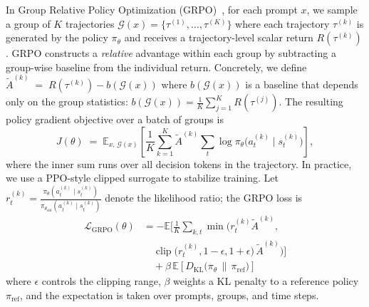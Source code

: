 In Group Relative Policy Optimization (GRPO)~\citep{shao2024deepseekmathpushinglimitsmathematical}, for each prompt $x$, we sample a group of $K$ trajectories $\mathcal{G}(x) = \{\tau^{(1)}, \dots, \tau^{(K)}\}$
where each trajectory $\tau^{(k)}$ is generated by the policy $\pi_\theta$ and receives a trajectory-level scalar return $R(\tau^{(k)})$.
GRPO constructs a \emph{relative} advantage within each group by subtracting a group-wise baseline from the individual return. Concretely, we define $\tilde{A}^{(k)} \;=\; R(\tau^{(k)}) - b(\mathcal{G}(x))$
where $b(\mathcal{G}(x))$ is a baseline that depends only on the group statistics: $b(\mathcal{G}(x)) = \frac{1}{K} \sum_{j=1}^K R(\tau^{(j)})$.
The resulting policy gradient objective over a batch of groups is
\begin{equation*}
    J(\theta) \;=\; 
    \mathbb{E}_{x,\,\mathcal{G}(x)}\!\left[
        \frac{1}{K} \sum_{k=1}^K 
        \tilde{A}^{(k)} \sum_{t} \log \pi_\theta\!\big(a_t^{(k)} \mid s_t^{(k)}\big)
    \right],
\end{equation*}
where the inner sum runs over all decision tokens in the trajectory. In practice, we use a PPO-style clipped surrogate to stabilize training. Let $r_t^{(k)} = \frac{\pi_\theta(a_t^{(k)} \mid s_t^{(k)})}{\pi_{\theta_{\text{old}}}(a_t^{(k)} \mid s_t^{(k)})}$ denote the likelihood ratio; the GRPO loss is
\begin{equation}
\begin{split}
    \mathcal{L}_{\text{GRPO}}(\theta) &= - \mathbb{E}\Bigg[ \frac{1}{K} \sum_{k,t} \min\bigg( r_t^{(k)} \tilde{A}^{(k)}, \\
    &\quad \operatorname{clip}\big(r_t^{(k)}, 1-\epsilon, 1+\epsilon\big)\,\tilde{A}^{(k)} \bigg) \Bigg] \\
    &\quad + \beta\,\mathbb{E}\left[ D_{\mathrm{KL}}\big(\pi_\theta \,\|\, \pi_{\text{ref}}\big) \right]
\end{split}
\label{eq:grpo_loss}
\end{equation}
where $\epsilon$ controls the clipping range, $\beta$ weights a KL penalty to a reference policy $\pi_{\text{ref}}$, and the expectation is taken over prompts, groups, and time steps.

